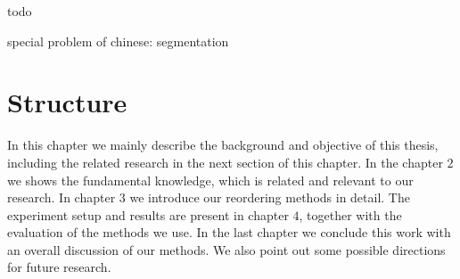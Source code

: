 todo

special problem of chinese: segmentation

\section{Structure}
\label{ch:Introduction:sec:Structure}

In this chapter we mainly describe the background and objective of this thesis, including the related research in the next section of this chapter. In the chapter $2$ we shows the fundamental knowledge, which is related and relevant to our research. In chapter $3$ we introduce our reordering methods in detail. The experiment setup and results are present in chapter $4$, together with the evaluation of the methods we use. In the last chapter we conclude this work with an overall discussion of our methods. We also point out some possible directions for future research.